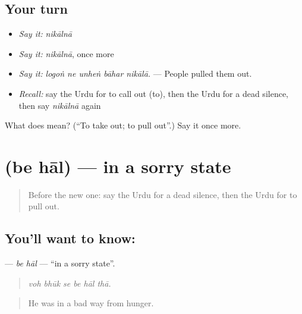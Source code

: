 \subsection*{Your turn}
\begin{itemize}
\raggedright
  \item \emph{Say it:} \emph{nikālnā}
  \item \emph{Say it:} \emph{nikālnā}, once more
  \item \emph{Say it:} \emph{logoṅ ne unheṅ bāhar nikālā.} — People pulled them out.
  \item \emph{Recall:} say the Urdu for to call out (to), then the Urdu for a dead silence, then say \emph{nikālnā} again
\end{itemize}

\begin{tcolorbox}[breakable,colback=teal!4,colframe=teal!35!black,title={Before you move on}]
What does  mean? (\textquotedblleft{}To take out; to pull out\textquotedblright{}.) Say it once more.
\end{tcolorbox}
\section[\texorpdfstring{\ur{بے} \ur{حال} (be hāl)}{بے حال (be hāl)}]{  (be hāl) — in a sorry state}

\label{lesson:UR-C295-be-hal}



\begin{quote}
Before the new one: say the Urdu for a dead silence, then the Urdu for to pull out.
\end{quote}

\subsection*{You'll want to know:  }
\textbf{ } — \emph{be hāl} — \textquotedblleft{}in a sorry state\textquotedblright{}.

\begin{quote}
     
\end{quote}

\begin{quote}
\emph{voh bhūk se be hāl thā.}
\end{quote}

\begin{quote}
He was in a bad way from hunger.
\end{quote}

